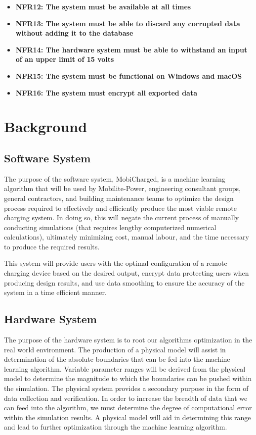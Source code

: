 \documentclass[12pt, titlepage]{article}
\begin{document}
\begin{center}
\begin{itemize}
        \item \textbf{NFR12: The system must be available at all times}
        \item \textbf{NFR13: The system must be able to discard any corrupted data without adding it to the database}
        \item \textbf{NFR14: The hardware system must be able to withstand an input of an upper limit of 15 volts}
        \item \textbf{NFR15: The system must be functional on Windows and macOS}
        \item \textbf{NFR16: The system must encrypt all exported data}
    \end{itemize}
\end{center}

\section{Background}
\subsection{Software System}
The purpose of the software system, MobiCharged, is a machine learning algorithm that will be used by Mobilite-Power, engineering consultant groups, general contractors, and building maintenance teams to optimize the design process required to effectively and efficiently produce the most viable remote charging system. In doing so, this will negate the current process of manually conducting simulations (that requires lengthy computerized numerical calculations), ultimately minimizing cost, manual labour, and the time necessary to produce the required results.
\par
This system will provide users with the optimal configuration of a remote charging device based on the desired output, encrypt data protecting users when producing design results, and use data smoothing to ensure the accuracy of the system in a time efficient manner.

\subsection{Hardware System}
The purpose of the hardware system is to root our algorithms optimization in the real world environment. The production of a physical model will assist in determination of the absolute boundaries that can be fed into the machine learning algorithm. Variable parameter ranges will be derived from the physical model to determine the magnitude to which the boundaries can be pushed within the simulation. The physical system provides a secondary purpose in the form of data collection and verification. In order to increase the breadth of data that we can feed into the algorithm, we must determine the degree of computational error within the simulation results. A physical model will aid in determining this range and lead to further optimization through the machine learning algorithm.
\end{document}
